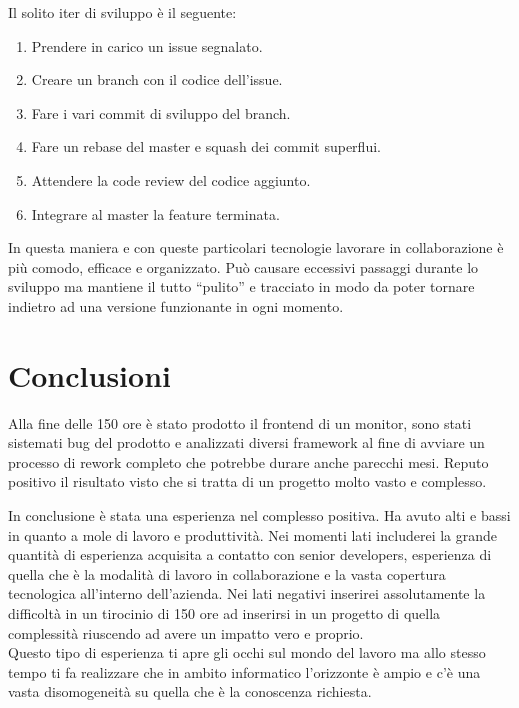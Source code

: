 \documentclass[a4paper]{article}
\begin{document}
Il solito iter di sviluppo è il seguente:
\begin{enumerate}
	\item Prendere in carico un issue segnalato.
	\item Creare un branch con il codice dell'issue.
	\item Fare i vari commit di sviluppo del branch.
	\item Fare un rebase del master e squash dei commit superflui.
	\item Attendere la code review del codice aggiunto.
	\item Integrare al master la feature terminata.
\end{enumerate}
\par In questa maniera e con queste particolari tecnologie lavorare in collaborazione
è più comodo, efficace e organizzato. Può causare eccessivi passaggi durante lo sviluppo
ma mantiene il tutto ``pulito'' e tracciato in modo da poter tornare indietro ad una
versione funzionante in ogni momento. 

\section{Conclusioni}
\par Alla fine delle 150 ore è stato prodotto il frontend di un monitor, sono stati
sistemati bug del prodotto e analizzati diversi framework al fine di avviare un
processo di rework completo che potrebbe durare anche parecchi mesi. Reputo positivo il risultato
visto che si tratta di un progetto molto vasto e complesso.
\par In conclusione è stata una esperienza nel complesso positiva. Ha avuto alti e bassi in quanto 
a mole di lavoro e produttività. Nei momenti lati includerei la grande quantità
di esperienza acquisita a contatto con senior developers, esperienza di quella che è
la modalità di lavoro in collaborazione e la vasta copertura tecnologica all'interno
dell'azienda. Nei lati negativi inserirei assolutamente la difficoltà in un tirocinio
di 150 ore ad inserirsi in un progetto di quella complessità riuscendo ad avere un 
impatto vero e proprio. \\
Questo tipo di esperienza ti apre gli occhi sul mondo del lavoro ma allo stesso tempo
ti fa realizzare che in ambito informatico l'orizzonte è ampio e c'è una vasta disomogeneità
su quella che è la conoscenza richiesta.

\end{document}
